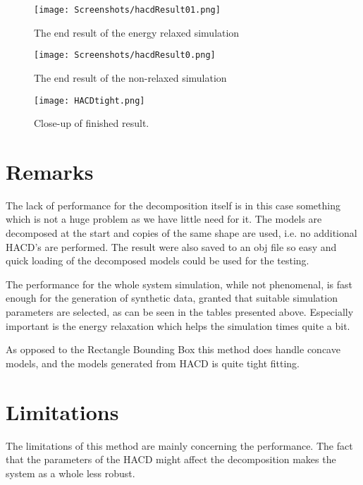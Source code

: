 \begin{figure}[H]
  \centering
  \texttt{[image: Screenshots/hacdResult01.png]}
  \caption{The end result of the energy relaxed simulation}
  \label{fig:hacd0.1}
\end{figure}

\begin{figure}[H]
  \centering
  \texttt{[image: Screenshots/hacdResult0.png]}
  \caption{The end result of the non-relaxed simulation}
  \label{fig:hacd0.0}
\end{figure}

\begin{figure}[H]
  \centering
  \texttt{[image: HACDtight.png]}
  \caption{Close-up of finished result.}
\end{figure}

\section{Remarks}
The lack of performance for the decomposition itself is in this case something
which is not a huge problem as we have little need for it. The models are
decomposed at the start and copies of the same shape are used, i.e. no additional
HACD's are performed. The result were also saved to an obj file so easy and quick
 loading of the decomposed models could be used for the testing.

The performance for the whole system simulation, while not phenomenal, is fast enough
for the generation of synthetic data, granted that suitable simulation parameters
are selected, as can be seen in the tables presented above. Especially important
is the energy relaxation which helps the simulation times quite a bit.

As opposed to the Rectangle Bounding Box this method does handle concave models,
and the models generated from HACD is quite tight fitting.

\section{Limitations}
The limitations of this method are mainly concerning the performance. The fact
that the parameters of the HACD might affect the decomposition makes the system
as a whole less robust.
